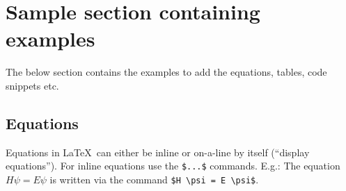 \documentclass{article}
\begin{document}







\pagebreak
\section*{Sample section containing examples}
The below section contains the examples to add the equations, tables, code snippets etc.

\subsection{Equations}\label{sec4}

Equations in \LaTeX\ can either be inline or on-a-line by itself (``display equations''). For
inline equations use the \verb+$...$+ commands. E.g.: The equation
$H\psi = E \psi$ is written via the command \verb+$H \psi = E \psi$+.
\end{document}
